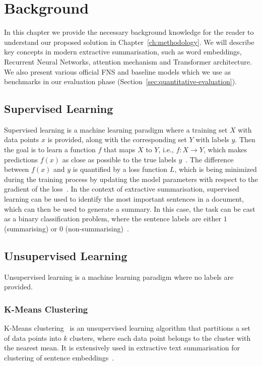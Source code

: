 \chapter{Background}\label{ch:background}
In this chapter we provide the necessary background knowledge for the reader to understand our proposed solution in Chapter~\ref{ch:methodology}.
We will describe key concepts in modern extractive summarisation, such as word embeddings, Recurrent Neural Networks, attention mechanism and Transformer architecture.
We also present various official FNS and baseline models which we use as benchmarks in our evaluation phase (Section~\ref{sec:quantitative-evaluation}).

\section{Supervised Learning}\label{sec:supervised_learning}
Supervised learning is a machine learning paradigm where a training set $X$ with data points $x$ is provided, along with the corresponding set $Y$ with labels $y$.
Then the goal is to learn a function $f$ that maps $X$ to $Y$, i.e., $f: X \rightarrow Y$, which makes predictions $f(x)$ as close as possible to the true labels $y$~\cite{sammut2011encyclopedia}.
The difference between $f(x)$ and $y$ is quantified by a loss function $L$, which is being minimized during the training process by updating the model parameters with respect to the gradient of the loss~\cite{Goodfellow-et-al-2016}.
In the context of extractive summarisation, supervised learning can be used to identify the most important sentences in a document, which can then be used to generate a summary.
In this case, the task can be cast as a binary classification problem, where the sentence labels are either $1$ (summarising) or $0$ (non-summarising)~\cite{manning_raghavan_schutze_2008}.

\section{Unsupervised Learning}\label{sec:unsupervised_learning}
Unsupervised learning is a machine learning paradigm where no labels are provided.



\subsection{K-Means Clustering}\label{sec:kmeans}
K-Means clustering~\cite{kmeans} is an unsupervised learning algorithm that partitions a set of data points into $k$ clusters,
where each data point belongs to the cluster with the nearest mean.
It is extensively used in extractive text summarisation for clustering of sentence embeddings~\cite{gokhan-etal-2021-extractive, foroutan-etal-2022-multilingual}.




